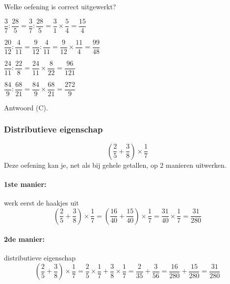 \documentclass{bis}
\begin{document}
\begin{exercise}
Welke oefening is correct uitgewerkt?
\begin{meerkeuze}
  \item $\dfrac{3}{7}:\dfrac{28}{5}=\dfrac{3}{7}:\dfrac{28}{5}=\dfrac{3}{1}\times\dfrac{5}{4}=\dfrac{15}{4}$
  \item $\dfrac{20}{12}:\dfrac{4}{11}=\dfrac{9}{12}:\dfrac{4}{11}=\dfrac{9}{12}\times\dfrac{11}{4}=\dfrac{99}{48}$
  \item $\dfrac{24}{11}:\dfrac{22}{8}=\dfrac{24}{11}\times\dfrac{8}{22}=\dfrac{96}{121}$
  \item $\dfrac{84}{9}:\dfrac{68}{21}=\dfrac{84}{9}\times\dfrac{68}{21}=\dfrac{272}{9}$
\end{meerkeuze}
\end{exercise}

\begin{solution}
Antwoord (C).
\end{solution}

\subsubsection{Distributieve eigenschap}

\begin{voorbeeld}
\[\left(\dfrac{2}{5}+\dfrac{3}{8}\right)\times\dfrac{1}{7}\]
Deze oefening kan je, net als bij gehele getallen, op 2 manieren uitwerken.

\paragraph*{1ste manier:} werk eerst de haakjes uit
\[\left(\dfrac{2}{5}+\dfrac{3}{8}\right)\times\dfrac{1}{7}=\left(\dfrac{16}{40}+\dfrac{15}{40}\right)\times\dfrac{1}{7}=\dfrac{31}{40}\times\dfrac{1}{7}=\dfrac{31}{280}\]

\paragraph*{2de manier:} distributieve eigenschap
\[\left(\dfrac{2}{5}+\dfrac{3}{8}\right)\times\dfrac{1}{7}=\dfrac{2}{5}\times\dfrac{1}{7}+\dfrac{3}{8}\times\dfrac{1}{7}=\dfrac{2}{35}+\dfrac{3}{56}=\dfrac{16}{280}+\dfrac{15}{280}=\dfrac{31}{280}\]
\end{voorbeeld}
\end{document}

